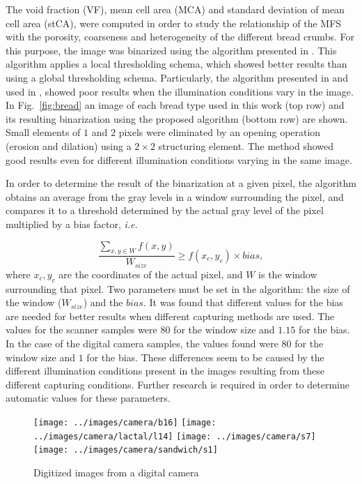 The void fraction (VF), mean cell area (MCA) and standard deviation of mean cell area (stCA), were computed in order to study the relationship of the MFS with the porosity, coarseness and heterogeneity of the different bread crumbs. For this purpose, the image was binarized using the algorithm presented in \cite{White83}. This algorithm applies a local thresholding schema, which showed better results than using a global thresholding schema. Particularly, the algorithm presented in \cite{Huang95} and used in \cite{Gonzales2008}, showed poor results when the illumination conditions vary in the image. In Fig.~\ref{fig:bread} an image of each bread type used in this work (top row) and its resulting binarization using the proposed algorithm (bottom row) are shown. Small elements of $1$ and $2$ pixels were eliminated by an opening operation (erosion and dilation) using a $2\times2$ structuring element. The method showed good results even for different illumination conditions varying in the same image. 

In order to determine the result of the binarization at a given pixel, the algorithm obtains an average from the gray levels in a window surrounding the pixel, and compares it to a threshold determined by the actual gray level of the pixel multiplied by a bias factor, {\em i.e.}

\begin{equation}
\frac{\sum_{x,y \in W} f(x,y) }{W_{size}} \geq f(x_{c},y_{c}) \times bias,
\label{eqn:white}
\end{equation}
where $x_{c},y_{c}$ are the coordinates of the actual pixel, and $W$ is the window surrounding that pixel. Two parameters must be set in the algorithm: the size of the window ($W_{size}$) and the $bias$. It was found that different values for the bias are needed for better results when different capturing methods are used. The values for the scanner samples were $80$ for the window size and $1.15$ for the bias. In the case of the digital camera samples, the values found were $80$ for the window size and $1$ for the bias. These differences seem to be caused by the different illumination conditions present in the images resulting from these different capturing conditions. Further research is required in order to determine automatic values for these parameters.

\begin{figure}[htb]
\centering
\texttt{[image: ../images/camera/b16]}
\texttt{[image: ../images/camera/lactal/l14]}
\texttt{[image: ../images/camera/s7]}
\texttt{[image: ../images/camera/sandwich/s1]}
\caption{Digitized images from a digital camera}
\label{fig:camera}
\end{figure}

